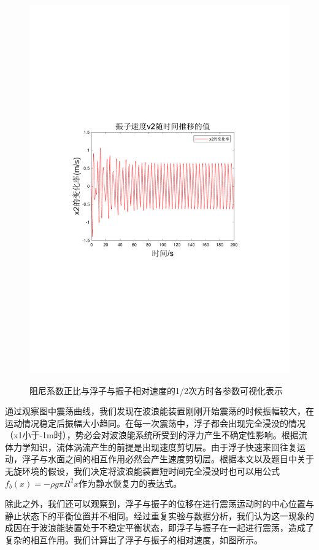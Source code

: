 \documentclass[12pt,utf8]{article}
\begin{document}
\begin{figure}[htbp]
\begin{minipage}{0.45\linewidth}
		\includegraphics[width=0.9\linewidth]{figures/T1-2振子速度v2.pdf}
		\label{chutian4}%
	\end{minipage}
	\caption{阻尼系数正比与浮子与振子相对速度的1/2次方时各参数可视化表示}
\end{figure}

通过观察图中震荡曲线，我们发现在波浪能装置刚刚开始震荡的时候振幅较大，在运动情况稳定后振幅大小趋同。在每一次震荡中，浮子都会出现完全浸没的情况（x1小于-1m时），势必会对波浪能系统所受到的浮力产生不确定性影响。根据流体力学知识，流体涡流产生的前提是出现速度剪切层。由于浮子快速来回往复运动，浮子与水面之间的相互作用必然会产生速度剪切层。根据本文以及题目中关于无旋环境的假设，我们决定将波浪能装置短时间完全浸没时也可以用公式$f_b(x) = -\rho g\pi R^2x$作为静水恢复力的表达式。

除此之外，我们还可以观察到，浮子与振子的位移在进行震荡运动时的中心位置与静止状态下的平衡位置并不相同。经过重复实验与数据分析，我们认为这一现象的成因在于波浪能装置处于不稳定平衡状态，即浮子与振子在一起进行震荡，造成了复杂的相互作用。我们计算出了浮子与振子的相对速度，如图所示。
\end{document}

